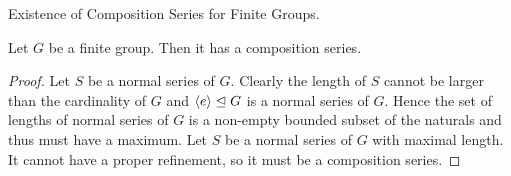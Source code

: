 \documentclass[../../book.tex]{subfiles}
\begin{document}
\begin{thm} Existence of Composition Series for Finite Groups.
    
    Let $G$ be a finite group.
    Then it has a composition series.
    
\end{thm}
\begin{proof}
    
    Let $S$ be a normal series of $G$.
    Clearly the length of $S$ cannot be larger than the cardinality of $G$
    and $\langle e\rangle \trianglelefteq G$ is a normal series of $G$.
    Hence the set of lengths of normal series of $G$ is a non-empty
    bounded subset of the naturals
    and thus must have a maximum. 
    Let $\hat{S}$ be a normal series of $G$ with maximal length. 
    It cannot have a proper refinement, so it must be a composition series.
    
\end{proof}
\end{document}
